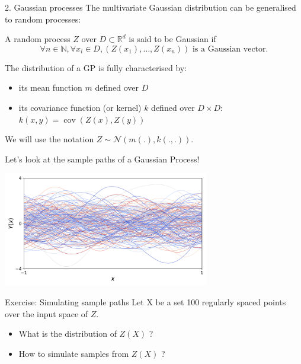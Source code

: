 \documentclass{beamer}
\DeclareMathOperator*{\Cov}{cov}
\begin{document}
\begin{frame}{2. Gaussian processes}
The multivariate Gaussian distribution can be generalised to random processes:
\begin{definition}
A random process $Z$ over $D \subset \mathds{R}^d$ is said to be Gaussian if
\begin{equation*}
\forall n \in \mathds{N}, \forall x_i \in D, (Z(x_1),\dots,Z(x_n)) \text{  is a Gaussian vector}.
\end{equation*}
\end{definition}
The distribution of a GP is fully characterised by:
\begin{itemize}
	\item its mean function $m$ defined over $D$
	\item its covariance function (or kernel) $k$ defined over $D \times D$: $k(x,y) = \Cov(Z(x),Z(y))$
\end{itemize}
We will use the notation $Z \sim \mathcal{N}(m(.),k(.,.))$.\\
\end{frame}

\begin{frame}{}
Let's look at the sample paths of a Gaussian Process!\\
\vspace{2mm}
\begin{center}
\includegraphics[height=5cm]{figures/python/gp_samples}
\end{center}
\end{frame}

\begin{frame}{}
\begin{exampleblock}{Exercise: Simulating sample paths}
Let X be a set 100 regularly spaced points over the input space of $Z$.
\begin{itemize}
	\item What is the distribution of $Z(X)$ ?
	\item How to simulate samples from $Z(X)$ ?
\end{itemize}
\end{exampleblock}
\end{frame}
\end{document}
